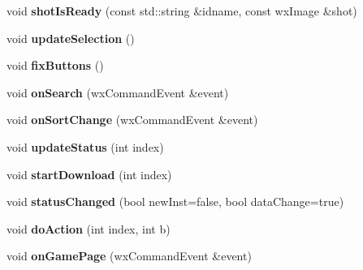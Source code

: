 \begin{DoxyCompactItemize}
\item 
\hypertarget{struct_list_tab_a5aff2789c36a9d39abc5efb2f2b0c0b1}{void {\bfseries shot\-Is\-Ready} (const std\-::string \&idname, const wx\-Image \&shot)}\label{struct_list_tab_a5aff2789c36a9d39abc5efb2f2b0c0b1}

\item 
\hypertarget{struct_list_tab_aadb7063955574c13d9eea164a32fdb5b}{void {\bfseries update\-Selection} ()}\label{struct_list_tab_aadb7063955574c13d9eea164a32fdb5b}

\item 
\hypertarget{struct_list_tab_a62965404468a435a88f9be74f8723a9a}{void {\bfseries fix\-Buttons} ()}\label{struct_list_tab_a62965404468a435a88f9be74f8723a9a}

\item 
\hypertarget{struct_list_tab_ad8eb6ed06371784633dd1cf96b734490}{void {\bfseries on\-Search} (wx\-Command\-Event \&event)}\label{struct_list_tab_ad8eb6ed06371784633dd1cf96b734490}

\item 
\hypertarget{struct_list_tab_a7e159fadab965b718ab25ac1f0803c47}{void {\bfseries on\-Sort\-Change} (wx\-Command\-Event \&event)}\label{struct_list_tab_a7e159fadab965b718ab25ac1f0803c47}

\item 
\hypertarget{struct_list_tab_a9b8d8bc1ae764b235c7445b3d1ca196a}{void {\bfseries update\-Status} (int index)}\label{struct_list_tab_a9b8d8bc1ae764b235c7445b3d1ca196a}

\item 
\hypertarget{struct_list_tab_a6f6ea57ef9c4e90c5ca094aec8b7a2b7}{void {\bfseries start\-Download} (int index)}\label{struct_list_tab_a6f6ea57ef9c4e90c5ca094aec8b7a2b7}

\item 
\hypertarget{struct_list_tab_a77ce1163d4dd1c18f445a1166aab77b3}{void {\bfseries status\-Changed} (bool new\-Inst=false, bool data\-Change=true)}\label{struct_list_tab_a77ce1163d4dd1c18f445a1166aab77b3}

\item 
\hypertarget{struct_list_tab_afc980d99c305488242a583bc61225fe0}{void {\bfseries do\-Action} (int index, int b)}\label{struct_list_tab_afc980d99c305488242a583bc61225fe0}

\item 
\hypertarget{struct_list_tab_a7052d63cb8a4552553f794c257c06675}{void {\bfseries on\-Game\-Page} (wx\-Command\-Event \&event)}\label{struct_list_tab_a7052d63cb8a4552553f794c257c06675}


\end{DoxyCompactItemize}
